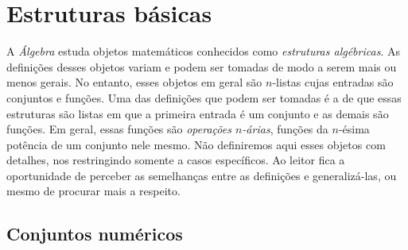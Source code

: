 
\chapter{Estruturas básicas}

A \emph{Álgebra} estuda objetos matemáticos conhecidos como \emph{estruturas algébricas}. As definições desses objetos variam e podem ser tomadas de modo a serem mais ou menos gerais. No entanto, esses objetos em geral são $n$-listas cujas entradas são conjuntos e funções. Uma das definições que podem ser tomadas é a de que essas estruturas são listas em que a primeira entrada é um conjunto e as demais são funções. Em geral, essas funções são \emph{operações $n$-árias}, funções da $n$-ésima potência de um conjunto nele mesmo. Não definiremos aqui esses objetos com detalhes, nos restringindo somente a casos específicos. Ao leitor fica a oportunidade de perceber as semelhanças entre as definições e generalizá-las, ou mesmo de procurar mais a respeito.

\section{Conjuntos numéricos}


